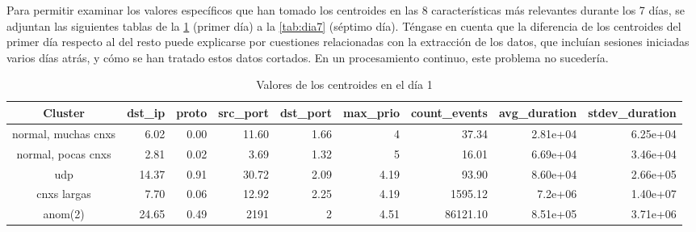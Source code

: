 Para permitir examinar los valores específicos que han tomado los centroides en las 8 características más relevantes durante los 7 días, se adjuntan las siguientes tablas de la \ref{tab:dia1} (primer día) a la \ref{tab:dia7} (séptimo día).
Téngase en cuenta que la diferencia de los centroides del primer día respecto al del resto puede explicarse por cuestiones relacionadas con la extracción de los datos,
que incluían sesiones iniciadas varios días atrás, y cómo se han tratado estos datos cortados.
En un procesamiento continuo, este problema no sucedería.

\begin{table}[h]
    \begingroup
    \setlength{\tabcolsep}{2pt} %
    \renewcommand{\arraystretch}{2} %
    \hspace*{-3cm}
    \begin{tabular}{|c|r|r|r|r|r|r|r|r|}
    \hline
    \textbf{Cluster}    & \textbf{dst\_ip} & \textbf{proto} & \textbf{src\_port} & \textbf{dst\_port} & \textbf{max\_prio} & \textbf{count\_events} & \textbf{avg\_duration} & \textbf{stdev\_duration} \\ \hline
    normal, muchas cnxs & 6.02             & 0.00           & 11.60              & 1.66               & 4                  & 37.34                  & 2.81e+04               & 6.25e+04                 \\ \hline
    normal, pocas cnxs  & 2.81             & 0.02           & 3.69               & 1.32               & 5                  & 16.01                  & 6.69e+04               & 3.46e+04                 \\ \hline
    udp                 & 14.37            & 0.91           & 30.72              & 2.09               & 4.19               & 93.90                  & 8.60e+04               & 2.66e+05                 \\ \hline
    cnxs largas         & 7.70             & 0.06           & 12.92              & 2.25               & 4.19               & 1595.12                & 7.2e+06                & 1.40e+07                 \\ \hline
    anom(2)             & 24.65            & 0.49           & 2191               & 2                  & 4.51               & 86121.10               & 8.51e+05               & 3.71e+06                 \\ \hline
    \end{tabular}
    \endgroup
\bigskip
\caption{Valores de los centroides en el día 1}
\bigskip
\label{tab:dia1}
\end{table}

